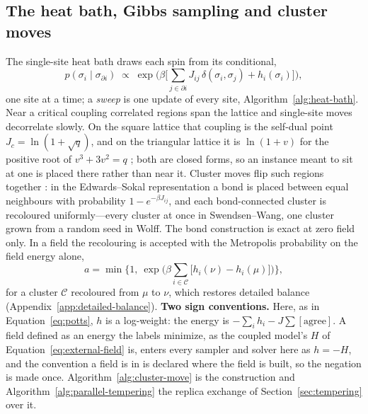 \documentclass[11pt,a4paper]{article}
\begin{document}
\subsection{The heat bath, Gibbs sampling and cluster moves}
\label{sec:potts-sampling}
The single-site heat bath draws each spin from its conditional,
\begin{equation}
  p(\sigma_i \mid \sigma_{\partial i}) \;\propto\;
    \exp\!\Big(\beta \big[\textstyle\sum_{j \in \partial i} J_{ij}\,\delta(\sigma_i, \sigma_j) + h_i(\sigma_i)\big]\Big),
  \label{eq:heat-bath}
\end{equation}
one site at a time; a \emph{sweep} is one update of every site,
Algorithm~\ref{alg:heat-bath}. Near a
critical coupling correlated regions span the lattice and single-site moves
decorrelate slowly. On the square lattice that coupling is the self-dual
point $J_c = \ln(1 + \sqrt{q})$, and on the triangular lattice it is
$\ln(1 + v)$ for the positive root of $v^3 + 3v^2 = q$ \citep{baxter1982};
both are closed forms, so an instance meant to sit at one is placed there
rather than near it. Cluster moves flip such regions together
\citep{swendsen1987, wolff1989, newman1999}: in the Edwards--Sokal
representation \citep{edwards1988} a bond is placed between equal neighbours
with probability $1 - e^{-\beta J_{ij}}$, and each bond-connected cluster is
recoloured uniformly---every cluster at once in Swendsen--Wang, one cluster
grown from a random seed in Wolff. The bond construction is exact at zero
field only. In a field the recolouring is accepted with the Metropolis
probability on the field energy alone,
\begin{equation}
  a = \min\Big\{1,\ \exp\!\Big(\beta \textstyle\sum_{i \in \mathcal{C}}
      \big[h_i(\nu) - h_i(\mu)\big]\Big)\Big\},
  \label{eq:cluster-accept}
\end{equation}
for a cluster $\mathcal{C}$ recoloured from $\mu$ to $\nu$, which restores
detailed balance (Appendix~\ref{app:detailed-balance}). \textbf{Two sign
conventions.} Here, as in Equation~\ref{eq:potts}, $h$ is a log-weight: the
energy is $-\sum_i h_i - J\sum[\text{agree}]$. A field defined as an energy
the labels minimize, as the coupled model's $H$ of
Equation~\ref{eq:external-field} is, enters every sampler and solver here as
$h = -H$, and the convention a field is in is declared where the field is
built, so the negation is made once.
Algorithm~\ref{alg:cluster-move} is the construction and
Algorithm~\ref{alg:parallel-tempering} the replica exchange of
Section~\ref{sec:tempering} over it.
\end{document}
